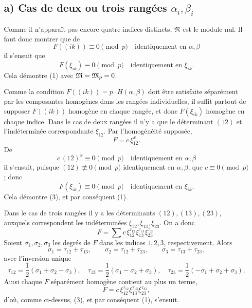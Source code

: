 \subsection*{a) Cas de deux ou trois rangées $\alpha_i,\beta_i$}

Comme il n'apparaît pas encore quatre indices distincts, $\mathfrak N$ est le module nul. Il faut donc montrer que de
\begin{equation}
        F((ik))\equiv0\pmod p\quad \text{identiquement en $\alpha,\beta$}
\end{equation}
il s'ensuit que
\[
        F(\xi_{ik})\equiv0\pmod p\quad \text{identiquement en $\xi_{ik}$}.
\]
Cela démontre (1) avec $\mathfrak M=\mathfrak M_p=0$.

Comme la condition $F((ik))=p\cdot H(\alpha,\beta)$ doit être satisfaite séparément par les composantes homogènes dans les rangées individuelles, il suffit partout de supposer $F((ik))$ homogène en chaque rangée, et donc $F(\xi_{ik})$ homogène en chaque indice. Dans le cas de deux rangées il n'y a que le déterminant $(12)$ et l'indéterminée correspondante $\xi_{12}$. Par l'homogénéité supposée,
\[
        F=c\,\xi_{12}^x.
\]
De
\[
        c\,(12)^x\equiv0\pmod p\quad \text{identiquement en $\alpha,\beta$}
\]
il s'ensuit, puisque $(12)\not\equiv0\pmod p$ identiquement en $\alpha,\beta$, que $c\equiv0\pmod p$; donc
\[
        F(\xi_{ik})\equiv0\pmod p\quad \text{identiquement en $\xi_{ik}$}.
\]
Cela démontre (3), et par conséquent (1).

Dans le cas de trois rangées il y a les déterminants $(12),(13),(23)$, auxquels correspondent les indéterminées $\xi_{12},\xi_{13},\xi_{23}$. On a donc
\[
        F=\sum c\,\xi_{12}^{\tau_{12}}\xi_{13}^{\tau_{13}}\xi_{23}^{\tau_{23}}.
\]
Soient $\sigma_1,\sigma_2,\sigma_3$ les degrés de $F$ dans les indices $1,2,3$, respectivement. Alors
\[
        \sigma_1=\tau_{12}+\tau_{13},\qquad
        \sigma_2=\tau_{12}+\tau_{23},\qquad
        \sigma_3=\tau_{13}+\tau_{23},
\]
avec l'inversion unique
\[
        \tau_{12}=\frac12(\sigma_1+\sigma_2-\sigma_3),\quad
        \tau_{13}=\frac12(\sigma_1-\sigma_2+\sigma_3),\quad
        \tau_{23}=\frac12(-\sigma_1+\sigma_2+\sigma_3).
\]
Ainsi chaque $F$ séparément homogène contient au plus un terme,
\[
        F=c\,\xi_{12}^{\tau_{12}}\xi_{13}^{\tau_{13}}\xi_{23}^{\tau_{23}},
\]
d'où, comme ci-dessus, (3), et par conséquent (1), s'ensuit.

